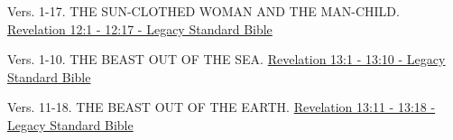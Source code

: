 \documentclass[
  ignorenonframetext,
]{beamer}
\begin{document}
\begin{frame}{12}
\label{section-265}
\begin{block}{Vers. 1-17. THE SUN-CLOTHED WOMAN AND THE MAN-CHILD.}
\label{vers.-1-17.-the-sun-clothed-woman-and-the-man-child.}
\href{https://read.lsbible.org/?q=rev12\%3A1-17}{Revelation 12:1 - 12:17
- Legacy Standard Bible}
\end{block}
\end{frame}

\begin{frame}{13}
\label{section-266}
\begin{block}{Vers. 1-10. THE BEAST OUT OF THE SEA.}
\label{vers.-1-10.-the-beast-out-of-the-sea.}
\href{https://read.lsbible.org/?q=rev13\%3A1-10}{Revelation 13:1 - 13:10
- Legacy Standard Bible}
\end{block}

\begin{block}{Vers. 11-18. THE BEAST OUT OF THE EARTH.}
\label{vers.-11-18.-the-beast-out-of-the-earth.}
\href{https://read.lsbible.org/?q=rev13\%3A11-18}{Revelation 13:11 -
13:18 - Legacy Standard Bible}
\end{block}
\end{frame}
\end{document}
